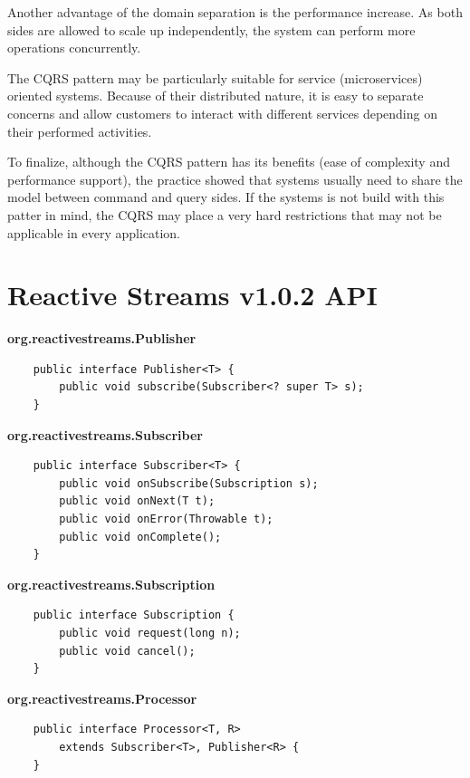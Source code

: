 \documentclass[oneside,
  digital, %
  table,   %
  nolof,     %
  nolot,     %
]{fithesis3}
\begin{document}
Another advantage of the domain separation is the performance increase. As both sides are allowed to scale up independently, the system can perform more operations concurrently.

The CQRS pattern may be particularly suitable for service (microservices) oriented systems. Because of their distributed nature, it is easy to separate concerns and allow customers to interact with different services depending on their performed activities.

To finalize, although the CQRS pattern has its benefits (ease of complexity and performance support), the practice showed that systems usually need to share the model between command and query sides. If the systems is not build with this patter in mind, the CQRS may place a very hard restrictions that may not be applicable in every application.


\chapter{Reactive Streams v1.0.2 API}
\label{reactive_streams}

\noindent
\textbf{org.reactivestreams.Publisher}

\begin{verbatim}
    public interface Publisher<T> {
        public void subscribe(Subscriber<? super T> s);
    }
\end{verbatim}

\noindent
\textbf{org.reactivestreams.Subscriber}

\begin{verbatim}
    public interface Subscriber<T> {
        public void onSubscribe(Subscription s);
        public void onNext(T t);
        public void onError(Throwable t);
        public void onComplete();
    }
\end{verbatim}

\noindent
\textbf{org.reactivestreams.Subscription}

\begin{verbatim}
    public interface Subscription {
        public void request(long n);
        public void cancel();
    }
\end{verbatim}

\noindent
\textbf{org.reactivestreams.Processor}

\begin{verbatim}
    public interface Processor<T, R> 
        extends Subscriber<T>, Publisher<R> {
    }
\end{verbatim}
\end{document}
